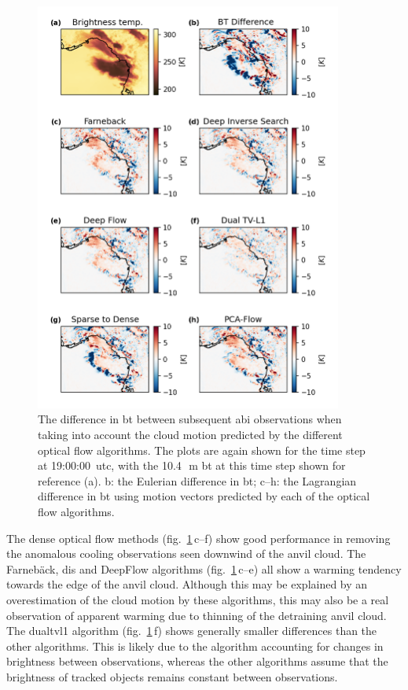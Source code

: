 \begin{figure}[tp]
    \centering
    \includegraphics[width=0.9\textwidth]{figures/chapter1_11.png}
    \caption[
    The difference in \acrshort{bt} between subsequent \acrshort{abi} observations when taking into account the cloud motion predicted by the different optical flow algorithms.
    ]{
    The difference in \acrshort{bt} between subsequent \acrshort{abi} observations when taking into account the cloud motion predicted by the different optical flow algorithms. The plots are again shown for the time step at 19:00:00~\acrshort{utc}, with the 10.4\,\unit{\mu m} \acrshort{bt} at this time step shown for reference (a). b: the Eulerian difference in \acrshort{bt}; c--h: the Lagrangian difference in \acrshort{bt} using motion vectors predicted by each of the optical flow algorithms.
    }
    \label{fig:opt_flow_differences}
\end{figure}


The dense optical flow methods (fig.~\ref{fig:opt_flow_differences}\,c--f) show good performance in removing the anomalous cooling observations seen downwind of the anvil cloud.
The Farnebäck, \acrshort{dis} and DeepFlow algorithms (fig.~\ref{fig:opt_flow_differences}\,c--e) all show a warming tendency towards the edge of the anvil cloud.
Although this may be explained by an overestimation of the cloud motion by these algorithms, this may also be a real observation of apparent warming due to thinning of the detraining anvil cloud.
The \acrshort{dualtvl1} algorithm (fig.~\ref{fig:opt_flow_differences}\,f) shows generally smaller differences than the other algorithms.
This is likely due to the algorithm accounting for changes in brightness between observations, whereas the other algorithms assume that the brightness of tracked objects remains constant between observations.

